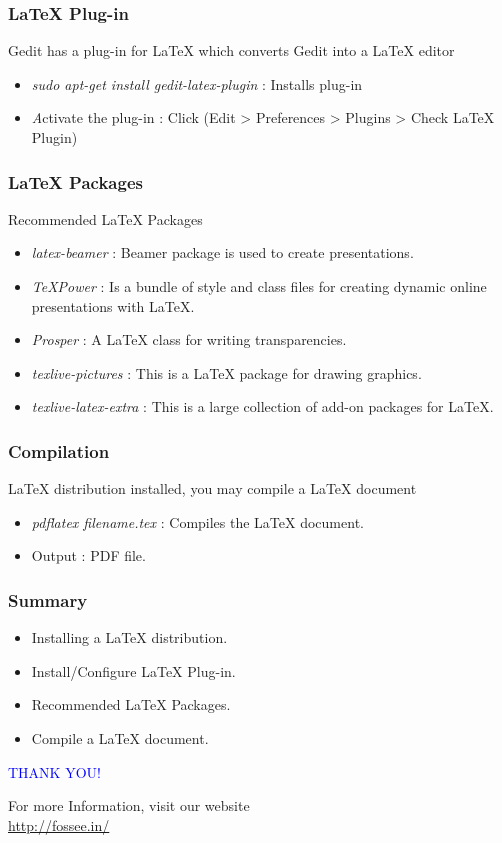 \documentclass[14pt,compress]{beamer}
\begin{document}
\begin{frame}[fragile]
  \frametitle{LaTeX Plug-in}
  Gedit has a plug-in for LaTeX which converts Gedit into a LaTeX editor
  \begin{itemize}
  \item \emph{sudo apt-get install gedit-latex-plugin} : Installs plug-in
  \item \emph Activate the plug-in : Click (Edit > Preferences > Plugins > Check LaTeX Plugin)
  \end{itemize}
\end{frame}

\begin{frame}[fragile]
  \frametitle{LaTeX Packages}
  Recommended LaTeX Packages
  \begin{itemize}
  \item \emph{latex-beamer} : Beamer package is used to create presentations.
  \item \emph{TeXPower} : Is a bundle of style and class files for creating dynamic online presentations with LaTeX.
  \item \emph{Prosper} : A LaTeX class for writing transparencies.
  \item \emph{texlive-pictures} : This is a LaTeX package for drawing graphics.
  \item \emph{texlive-latex-extra} : This is a large collection of add-on packages for LaTeX.
  \end{itemize}
\end{frame}

\begin{frame}[fragile]
  \frametitle{Compilation}
  LaTeX distribution installed, you may compile a LaTeX document
  \begin{itemize}
  \item \emph{pdflatex filename.tex} : Compiles the LaTeX document.
  \item Output : PDF file.
  \end{itemize} 
\end{frame}


\begin{frame}[fragile]
	\frametitle{Summary}
	\begin{itemize}
        \item Installing a LaTeX distribution.
        \item Install/Configure LaTeX Plug-in.
        \item Recommended LaTeX Packages.
	\item Compile a LaTeX document.
	\end{itemize}
\end{frame}

\begin{frame}
\begin{block}{}
  \begin{center}
  \textcolor{blue}{\Large THANK YOU!} 
  \end{center}
  \end{block}
\begin{block}{}
  \begin{center}
    For more Information, visit our website\\
    \url{http://fossee.in/}
  \end{center}  
  \end{block}
\end{frame}
\end{document}
